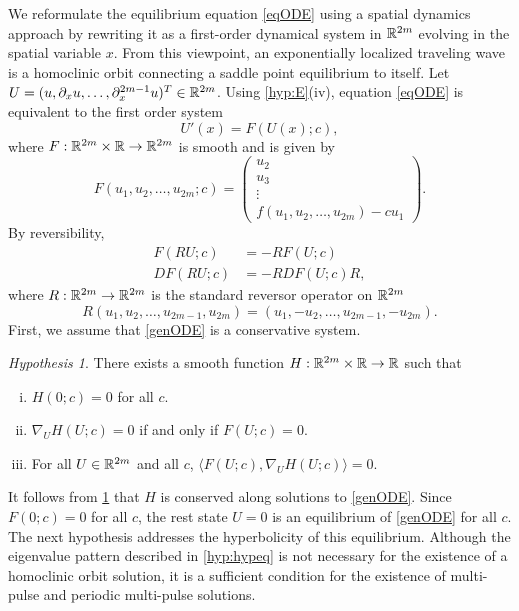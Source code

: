 \documentclass[12pt]{elsarticle}
\theoremstyle{plain}
\theoremstyle{definition}
\theoremstyle{remark}
\newtheorem{hypothesis}[theorem]{Hypothesis}
\numberwithin{theorem}{section}
\numberwithin{equation}{section}
\begin{document}
We reformulate the equilibrium equation \cref{eqODE} using a spatial dynamics approach by rewriting it as a first-order dynamical system in $\mathbb{R}^{2m}$ evolving in the spatial variable $x$. From this viewpoint, an exponentially localized traveling wave is a homoclinic orbit connecting a saddle point equilibrium to itself. Let $U = (u, \partial_x u, \dots, \partial_x^{2m-1} u)^T \in \mathbb{R}^{2m}$. Using \cref{hyp:E}(iv), equation \cref{eqODE} is equivalent to the first order system
\begin{equation}\label{genODE}
U'(x) = F(U(x); c),
\end{equation}
where $F: \mathbb{R}^{2m} \times \mathbb{R} \rightarrow \mathbb{R}^{2m}$ is smooth and is given by
\begin{equation}\label{defF}
F(u_1, u_2, \dots, u_{2m}; c) = 
\begin{pmatrix}
u_2 \\ u_3 \\ \vdots \\ f(u_1, u_2, \dots, u_{2m}) - c u_1
\end{pmatrix}.
\end{equation}
By reversibility,
\begin{equation}\label{genODErev}
\begin{aligned}
F(RU; c) &= -RF(U; c) \\
DF(RU; c) &= -RDF(U; c)R,
\end{aligned}
\end{equation}
where $R:\mathbb{R}^{2m} \rightarrow \mathbb{R}^{2m}$ is the standard reversor operator on $\mathbb{R}^{2m}$
\begin{equation}\label{reverserR2m}
R(u_1, u_2, \dots, u_{2m-1}, u_{2m}) = (u_1, -u_2, \dots, u_{2m-1}, -u_{2m}).
\end{equation}
First, we assume that \cref{genODE} is a conservative system.
\begin{hypothesis}\label{hyp:H}
There exists a smooth function $H: \mathbb{R}^{2m} \times \mathbb{R} \rightarrow \mathbb{R}$ such that 
\begin{enumerate}[(i)]
\item $H(0; c) = 0$ for all $c$.
\item $\nabla_U H(U; c) = 0$ if and only if $F(U; c) = 0$.
\item For all $U \in \mathbb{R}^{2m}$ and all $c$, $\langle F(U; c), \nabla_U H(U; c) \rangle = 0$.
\end{enumerate}
\end{hypothesis}

\noi It follows from \cref{hyp:H} that $H$ is conserved along solutions to \cref{genODE}. Since $F(0; c) = 0$ for all $c$, the rest state $U = 0$ is an equilibrium of \cref{genODE} for all $c$. The next hypothesis addresses the hyperbolicity of this equilibrium. Although the eigenvalue pattern described in \cref{hyp:hypeq} is not necessary for the existence of a homoclinic orbit solution, it is a sufficient condition for the existence of multi-pulse and periodic multi-pulse solutions.
\end{document}
